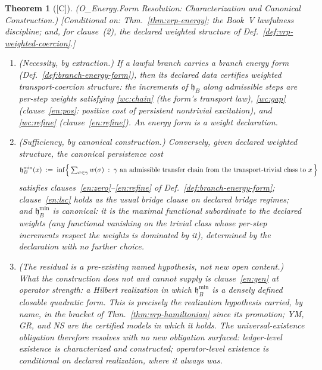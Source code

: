\documentclass[12pt,oneside]{amsbook}
\theoremstyle{plain}
\newtheorem{theorem}{Theorem}[section]
\theoremstyle{definition}
\theoremstyle{remark}
\newcommand{\status}[1]{\textup{[#1]}}
\begin{document}
\begin{theorem}[\status{C}]\label{thm:vrp-energy-form-char}
\textup{(O\_Energy.Form Resolution: Characterization and Canonical
Construction.)}
\textup{[Conditional on: Thm.~\ref{thm:vrp-energy}; the Book~V
lawfulness discipline; and, for clause~(2), the declared weighted
structure of Def.~\ref{def:vrp-weighted-coercion}.]}
\begin{enumerate}[label=\textup{(\arabic*)}]
  \item \emph{(Necessity, by extraction.)}  If a lawful branch
    carries a branch energy form
    (Def.~\ref{def:branch-energy-form}), then its declared data
    certifies weighted transport-coercion structure: the
    increments of $\mathfrak{h}_B$ along admissible steps are
    per-step weights satisfying \ref{wc:chain} (the form's
    transport law), \ref{wc:gap} (clause~\ref{en:pos}: positive
    cost of persistent nontrivial excitation), and
    \ref{wc:refine} (clause~\ref{en:refine}).  An energy form
    \emph{is} a weight declaration.
  \item \emph{(Sufficiency, by canonical construction.)}
    Conversely, given declared weighted structure, the
    \emph{canonical persistence cost}
    \[
      \mathfrak{h}_B^{\min}(x) \;:=\;
      \inf\Bigl\{\, \textstyle\sum_{\sigma \in \gamma} w(\sigma)
      \;:\; \gamma \text{ an admissible transfer chain from the
      transport-trivial class to } x \,\Bigr\}
    \]
    satisfies clauses~\ref{en:zero}--\ref{en:refine} of
    Def.~\ref{def:branch-energy-form}; clause~\ref{en:lsc} holds
    as the usual bridge clause on declared bridge regimes; and
    $\mathfrak{h}_B^{\min}$ is canonical: it is the
    \emph{maximal} functional subordinate to the declared weights
    (any functional vanishing on the trivial class whose
    per-step increments respect the weights is dominated by it),
    determined by the declaration with no further choice.
  \item \emph{(The residual is a pre-existing named hypothesis,
    not new open content.)}  What the construction does not and
    cannot supply is clause~\ref{en:gen} at operator strength: a
    Hilbert realization in which $\mathfrak{h}_B^{\min}$ is a
    densely defined closable quadratic form.  This is precisely
    the realization hypothesis carried, by name, in the bracket of
    Thm.~\ref{thm:vrp-hamiltonian} since its promotion; YM, GR,
    and NS are the certified models in which it holds.  The
    universal-existence obligation therefore resolves with no new
    obligation surfaced: ledger-level existence is characterized
    and constructed; operator-level existence is conditional on
    declared realization, where it always was.
\end{enumerate}
\end{theorem}
\end{document}
